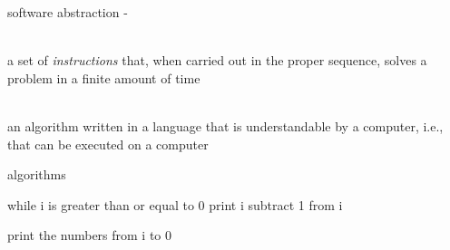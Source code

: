 \documentclass[10pt,t,svgnames]{beamer}
\makeatletter
\newlength\tightleftmargin{}
\newlength\diffleftmargin{}
\providecommand{\nextline}{
  \setlength\labelwidth{\tightleftmargin}
  \setlength\leftmargin{\tightleftmargin}
  \advance\linewidth\diffleftmargin{}
  \advance\@totalleftmargin-\diffleftmargin{}
  \parshape\@ne\@totalleftmargin\linewidth{}
  \setlength\itemsep{1.5ex}
}
\let\origdescription\description
\let\endorigdescription\enddescription
\renewenvironment{description}{\origdescription\nextline}{\endorigdescription}
\makeatother
\begin{document}
  \begin{frame}{software abstraction}
    \begin{description}
      \item [algorithm] \hfill \\
        a set of \emph{instructions} that, when carried out in the proper
        sequence, solves a problem in a finite amount of time
      \item [program] \hfill \\
        an algorithm written in a language that is understandable by a computer,
        i.e., that can be executed on a computer
    \end{description}
  \end{frame}

  \begin{frame}[fragile]{algorithms}
    \begin{termblock}
    while i is greater than or equal to 0
      print i
      subtract 1 from i
    \end{termblock}
    \vspace{2\baselineskip}
    \begin{termblock}
    print the numbers from i to 0
    \end{termblock}

  \end{frame}
\end{document}
